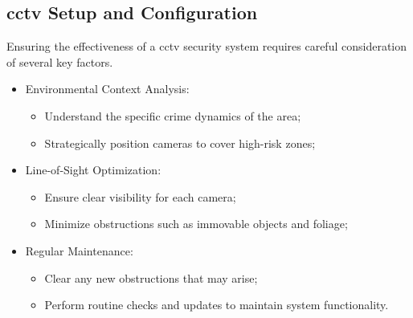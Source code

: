 \subsection{\ac{cctv} Setup and Configuration}
Ensuring the effectiveness of a \ac{cctv} security system requires careful consideration of several key factors.
\begin{itemize}
    \item Environmental Context Analysis:
        \begin{itemize}
            \item Understand the specific crime dynamics of the area;
            \item Strategically position cameras to cover high-risk zones;
        \end{itemize}
    \item Line-of-Sight Optimization:
    \begin{itemize}
        \item Ensure clear visibility for each camera;
        \item Minimize obstructions such as immovable objects and foliage;
    \end{itemize}
    \item Regular Maintenance:
    \begin{itemize}
        \item Clear any new obstructions that may arise;
        \item Perform routine checks and updates to maintain system functionality.
    \end{itemize}
\end{itemize}


